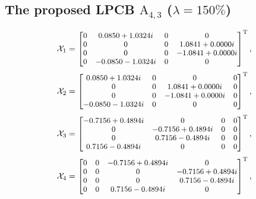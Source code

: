 \documentclass[journal]{IEEEtran}
\begin{document}
  \subsection{The proposed LPCB $\text{A}_{4,3}$ ($\lambda = 150\%$)} 
 \begin{equation}
  \footnotesize   
     \mathcal X_1=
\begin{bmatrix}
     0&  0.0850 + 1.0324i&  0& 0\\
   0&  0&  0&  1.0841 + 0.0000i\\
   0& 0&  0& -1.0841 + 0.0000i\\
   0& -0.0850 - 1.0324i&  0&  0\\
      \end{bmatrix}^{\text{T}}, \notag
  \end{equation}
\begin{equation}
  \footnotesize   
     \mathcal X_2=
\begin{bmatrix}
     0.0850 + 1.0324i&  0& 0&  0\\
   0&  0&  1.0841 + 0.0000i&  0\\
  0&  0& -1.0841 + 0.0000i&  0\\
  -0.0850 - 1.0324i&  0&  0&  0\\
      \end{bmatrix}^{\text{T}}, \notag
  \end{equation}
 \begin{equation}
  \footnotesize   
     \mathcal X_3=
\begin{bmatrix}
    -0.7156 + 0.4894i&  0&  0&  0\\
  0& -0.7156 + 0.4894i&  0&  0\\
   0&  0.7156 - 0.4894i&  0&  0\\
   0.7156 - 0.4894i& 0&  0&  0\\
      \end{bmatrix}^{\text{T}}, \notag
  \end{equation}
\begin{equation}
  \footnotesize   
     \mathcal X_4=
\begin{bmatrix}
     0&  0& -0.7156 + 0.4894i&  0\\
   0&  0& 0& -0.7156 + 0.4894i\\
   0&  0&  0&  0.7156 - 0.4894i\\
   0&  0&  0.7156 - 0.4894i& 0\\
      \end{bmatrix}^{\text{T}}, \notag
  \end{equation}
\end{document}
